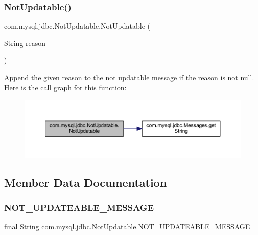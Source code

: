 \subsubsection{\texorpdfstring{Not\+Updatable()}{NotUpdatable()}\hspace{0.1cm}{\footnotesize\ttfamily [2/2]}}
{\footnotesize\ttfamily com.\+mysql.\+jdbc.\+Not\+Updatable.\+Not\+Updatable (\begin{DoxyParamCaption}\item[{String}]{reason }\end{DoxyParamCaption})}

Append the given reason to the not updatable message if the reason is not null. Here is the call graph for this function\+:
\nopagebreak
\begin{figure}[H]
\begin{center}
\leavevmode
\includegraphics[width=350pt]{classcom_1_1mysql_1_1jdbc_1_1_not_updatable_a11df678de184699dbb1be7c6cddad461_cgraph}
\end{center}
\end{figure}


\subsection{Member Data Documentation}
\mbox{\label{classcom_1_1mysql_1_1jdbc_1_1_not_updatable_ae7cbbc4b3401967b180760f8dc00edc8}} 
\subsubsection{\texorpdfstring{N\+O\+T\+\_\+\+U\+P\+D\+A\+T\+E\+A\+B\+L\+E\+\_\+\+M\+E\+S\+S\+A\+GE}{NOT\_UPDATEABLE\_MESSAGE}}
{\footnotesize\ttfamily final String com.\+mysql.\+jdbc.\+Not\+Updatable.\+N\+O\+T\+\_\+\+U\+P\+D\+A\+T\+E\+A\+B\+L\+E\+\_\+\+M\+E\+S\+S\+A\+GE\hspace{0.3cm}{\ttfamily [static]}}

